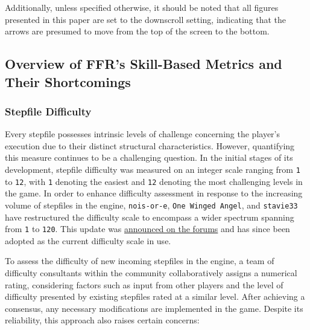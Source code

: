 \vspace{2mm}

Additionally, unless specified otherwise, it should be noted that all figures presented in this paper are set to the downscroll setting, indicating that the arrows are presumed to move from the top of the screen to the bottom.

\subsection{Overview of FFR's Skill-Based Metrics and Their Shortcomings}
\subsubsection{Stepfile Difficulty}
Every stepfile possesses intrinsic levels of challenge concerning the player's execution due to their distinct structural characteristics. However, quantifying this measure continues to be a challenging question. In the initial stages of its development, stepfile difficulty was measured on an integer scale ranging from \texttt{1} to \texttt{12}, with \texttt{1} denoting the easiest and \texttt{12} denoting the most challenging levels in the game. In order to enhance difficulty assessment in response to the increasing volume of stepfiles in the engine, \texttt{nois-or-e}, \texttt{One Winged Angel}, and \texttt{stavie33} have restructured the difficulty scale to encompass a wider spectrum spanning from \texttt{1} to \texttt{120}. This update was \href{https://www.flashflashrevolution.com/vbz/showthread.php?t=124260}{announced on the forums} and has since been adopted as the current difficulty scale in use.

\vspace{2mm}

To assess the difficulty of new incoming stepfiles in the engine, a team of difficulty consultants within the community collaboratively assigns a numerical rating, considering factors such as input from other players and the level of difficulty presented by existing stepfiles rated at a similar level. After achieving a consensus, any necessary modifications are implemented in the game. Despite its reliability, this approach also raises certain concerns:

